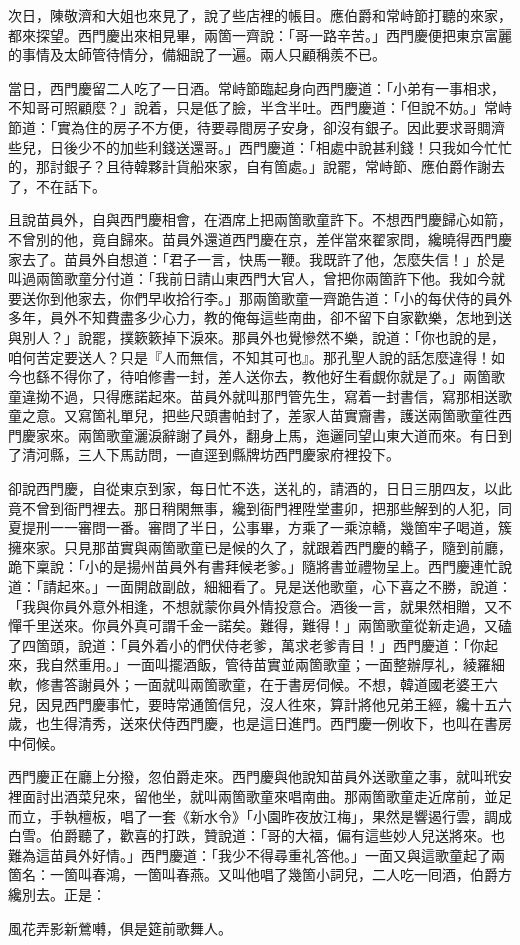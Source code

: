 次日，陳敬濟和大姐也來見了，說了些店裡的帳目。應伯爵和常峙節打聽的來家，都來探望。西門慶出來相見畢，兩箇一齊說：「哥一路辛苦。」西門慶便把東京富麗的事情及太師管待情分，備細說了一遍。兩人只顧稱羨不已。

當日，西門慶留二人吃了一日酒。常峙節臨起身向西門慶道：「小弟有一事相求，不知哥可照顧麼？」說着，只是低了臉，半含半吐。{}西門慶道：「但說不妨。」常峙節道：「實為住的房子不方便，待要尋間房子安身，卻沒有銀子。因此要求哥賙濟些兒，日後少不的加些利錢送還哥。」西門慶道：「相處中說甚利錢！只我如今忙忙的，那討銀子？且待韓夥計貨船來家，自有箇處。」說罷，常峙節、應伯爵作謝去了，不在話下。

且說苗員外，自與西門慶相會，在酒席上把兩箇歌童許下。不想西門慶歸心如箭，不曾別的他，竟自歸來。苗員外還道西門慶在京，差伴當來翟家問，纔曉得西門慶家去了。苗員外自想道：「君子一言，快馬一鞭。我既許了他，怎麼失信！」於是叫過兩箇歌童分付道：「我前日請山東西門大官人，曾把你兩箇許下他。我如今就要送你到他家去，你們早收拾行李。」那兩箇歌童一齊跪告道：「小的每伏侍的員外多年，員外不知費盡多少心力，教的俺每這些南曲，卻不留下自家歡樂，怎地到送與別人？」說罷，撲簌簌掉下淚來。那員外也覺慘然不樂，說道：「你也說的是，咱何苦定要送人？只是『人而無信，不知其可也』。那孔聖人說的話怎麼違得！如今也繇不得你了，待咱修書一封，差人送你去，{}教他好生看覷你就是了。」兩箇歌童違拗不過，只得應諾起來。苗員外就叫那門管先生，寫着一封書信，寫那相送歌童之意。又寫箇礼單兒，把些尺頭書帕封了，差家人苗實齎書，護送兩箇歌童徃西門慶家來。兩箇歌童灑淚辭謝了員外，翻身上馬，迤邐同望山東大道而來。有日到了清河縣，三人下馬訪問，一直逕到縣牌坊西門慶家府裡投下。

卻說西門慶，自從東京到家，每日忙不迭，送礼的，請酒的，日日三朋四友，以此竟不曾到衙門裡去。那日稍閑無事，纔到衙門裡陞堂畫卯，把那些解到的人犯，同夏提刑一一審問一番。審問了半日，公事畢，方乘了一乘涼轎，幾箇牢子喝道，簇擁來家。只見那苗實與兩箇歌童已是候的久了，就跟着西門慶的轎子，隨到前廳，跪下稟說：「小的是揚州苗員外有書拜候老爹。」隨將書並禮物呈上。西門慶連忙說道：「請起來。」一面開啟副啟，細細看了。見是送他歌童，心下喜之不勝，說道：「我與你員外意外相逢，不想就蒙你員外情投意合。酒後一言，就果然相贈，又不憚千里送來。你員外真可謂千金一諾矣。難得，難得！」兩箇歌童從新走過，又磕了四箇頭，說道：「員外着小的們伏侍老爹，萬求老爹青目！」西門慶道：「你起來，我自然重用。」一面叫擺酒飯，管待苗實並兩箇歌童；一面整辦厚礼，綾羅細軟，修書答謝員外；一面就叫兩箇歌童，在于書房伺候。不想，韓道國老婆王六兒，因見西門慶事忙，要時常通箇信兒，沒人徃來，算計將他兄弟王經，纔十五六歲，也生得清秀，送來伏侍西門慶，也是這日進門。西門慶一例收下，也叫在書房中伺候。

西門慶正在廳上分撥，忽伯爵走來。西門慶與他說知苗員外送歌童之事，就叫玳安裡面討出酒菜兒來，留他坐，就叫兩箇歌童來唱南曲。那兩箇歌童走近席前，並足而立，手執檀板，唱了一套《新水令》「小園昨夜放江梅」，果然是響遏行雲，調成白雪。伯爵聽了，歡喜的打跌，贊說道：「哥的大福，偏有這些妙人兒送將來。也難為這苗員外好情。」西門慶道：「我少不得尋重礼答他。」一面又與這歌童起了兩箇名：一箇叫春鴻，一箇叫春燕。又叫他唱了幾箇小詞兒，二人吃一囘酒，伯爵方纔別去。正是：

風花弄影新鶯囀，俱是筵前歌舞人。

